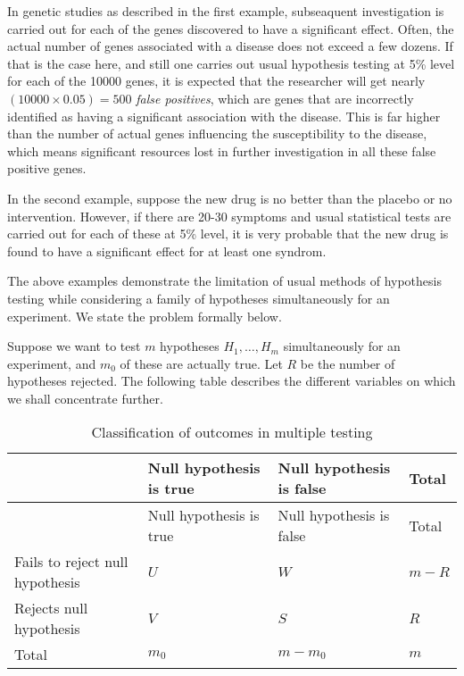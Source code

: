 \documentclass[
]{book}
\begin{document}
In genetic studies as described in the first example, subseaquent investigation is carried out for each of the genes discovered to have a significant effect. Often, the actual number of genes associated with a disease does not exceed a few dozens. If that is the case here, and still one carries out usual hypothesis testing at 5\% level for each of the 10000 genes, it is expected that the researcher will get nearly \((10000 \times 0.05) = 500\) \emph{false positives}, which are genes that are incorrectly identified as having a significant association with the disease. This is far higher than the number of actual genes influencing the susceptibility to the disease, which means significant resources lost in further investigation in all these false positive genes.

In the second example, suppose the new drug is no better than the placebo or no intervention. However, if there are 20-30 symptoms and usual statistical tests are carried out for each of these at 5\% level, it is very probable that the new drug is found to have a significant effect for at least one syndrom.

The above examples demonstrate the limitation of usual methods of hypothesis testing while considering a family of hypotheses simultaneously for an experiment. We state the problem formally below.

Suppose we want to test \(m\) hypotheses \(H_1, \ldots, H_m\) simultaneously for an experiment, and \(m_0\) of these are actually true. Let \(R\) be the number of hypotheses rejected. The following table describes the different variables on which we shall concentrate further.

\begin{longtable}[]{@{}
  >{\raggedright\arraybackslash}p{}
  >{\centering\arraybackslash}p{}
  >{\centering\arraybackslash}p{}
  >{\centering\arraybackslash}p{}@{}}
\caption{\label{tab:multipletesting} Classification of outcomes in multiple testing}\tabularnewline
\toprule
& Null hypothesis is true & Null hypothesis is false & Total \\
\midrule
\endfirsthead
\toprule
& Null hypothesis is true & Null hypothesis is false & Total \\
\midrule
\endhead
Fails to reject null hypothesis & \(U\) & \(W\) & \(m - R\) \\
Rejects null hypothesis & \(V\) & \(S\) & \(R\) \\
Total & \(m_0\) & \(m - m_0\) & \(m\) \\
\bottomrule
\end{longtable}
\end{document}
